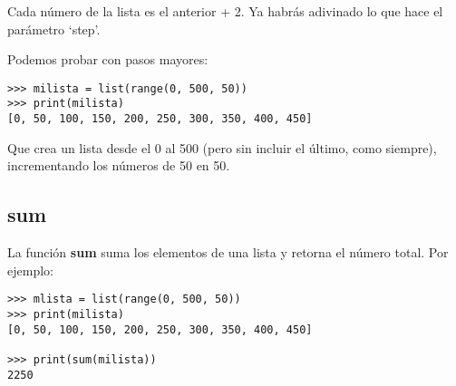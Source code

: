 
\noindent
Cada número de la lista es el anterior + 2.   Ya habrás adivinado lo que hace el parámetro `step'.

Podemos probar con pasos mayores:

\begin{listing}
\begin{verbatim}
>>> milista = list(range(0, 500, 50))
>>> print(milista)
[0, 50, 100, 150, 200, 250, 300, 350, 400, 450]
\end{verbatim}
\end{listing}

Que crea un lista desde el 0 al 500 (pero sin incluir el último, como siempre), incrementando los números de 50 en 50.

\subsection*{sum}

La función \textbf{sum} suma los elementos de una lista y retorna el número total.   Por ejemplo:

\begin{listing}
\begin{verbatim}
>>> mlista = list(range(0, 500, 50))
>>> print(milista)
[0, 50, 100, 150, 200, 250, 300, 350, 400, 450]

>>> print(sum(milista))
2250
\end{verbatim}
\end{listing}

\newpage
